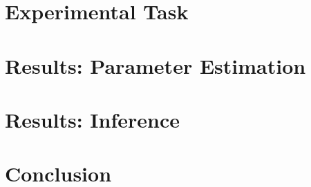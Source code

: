 \documentclass{article}
\begin{document}
\section{Experimental Task}
\label{sec:task}




\section{Results: Parameter Estimation}
\label{sec:results-param}



\section{Results: Inference}
\label{sec:results-inference}


\section{Conclusion}
\label{sec:conclusion}

\end{document}
